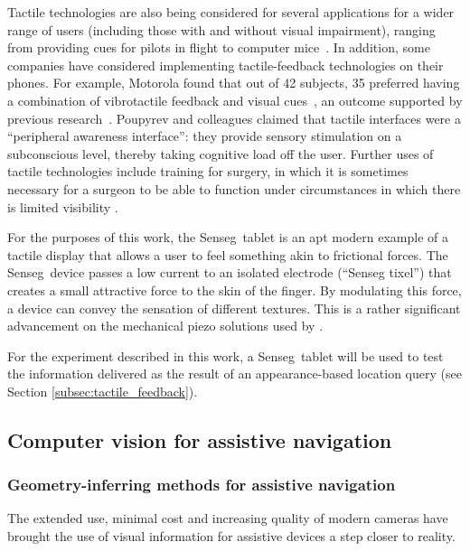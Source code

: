 Tactile technologies are also being considered for several applications for a wider range of users (including those with and without visual impairment), ranging from providing cues for pilots in flight \citep{spirkovska2005summary} to computer mice~\citep{akamatsu1996movement}. In addition, some companies have considered implementing tactile-feedback technologies on their phones. For example, Motorola found that out of 42 subjects, 35 preferred having a combination of vibrotactile feedback and visual cues~\citep{chang2005audio}, an outcome supported by previous research~\citep{poupyrev2002ambient}. Poupyrev and colleagues claimed that tactile interfaces were a ``peripheral awareness interface'': they provide sensory stimulation on a subconscious level, thereby taking cognitive load off the user. Further uses of tactile technologies include training for surgery, in which it is sometimes necessary for a surgeon to be able to function under circumstances in which there is limited visibility \citep{hu2006effectiveness}.

For the purposes of this work, the Senseg\texttrademark\ tablet is an apt modern example of a tactile display that allows a user to feel something akin to frictional forces. The Senseg\texttrademark\ device  passes a low current to an isolated electrode (``Senseg tixel'') that creates a small attractive force to the skin of the finger. By modulating this force, a device can convey the sensation of different textures. This is a rather significant advancement on the mechanical piezo solutions used by \citet{bliss1970optical}. 

For the experiment described in this work, a Senseg\texttrademark\ tablet will be used to test the information delivered as the result of an appearance-based location query (see Section \ref{subsec:tactile_feedback}).

\subsection{Computer vision for assistive navigation}

\subsubsection{Geometry-inferring methods for assistive navigation}

The extended use, minimal cost and increasing quality of modern cameras have brought the use of visual information for assistive devices a step closer to reality. 


